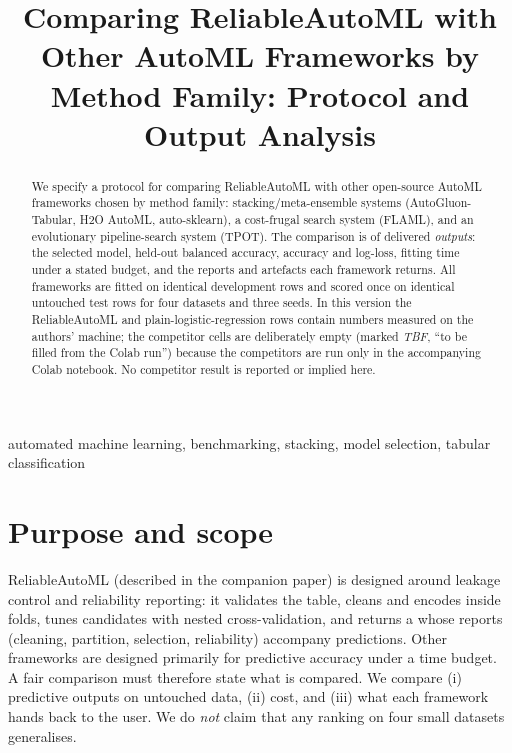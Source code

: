 \documentclass[conference]{IEEEtran}
\title{Comparing ReliableAutoML with Other AutoML Frameworks by Method Family: Protocol and Output Analysis}
\author{\jabulaniauthor\and\martinchanzauthor\and\oloratoauthor\and\mfundoauthor}
\newcommand{\tbf}{\textit{TBF}}
\begin{document}
\maketitle
\begin{abstract}
We specify a protocol for comparing ReliableAutoML with other open-source AutoML frameworks chosen by method family: stacking/meta-ensemble systems (AutoGluon-Tabular, H2O AutoML, auto-sklearn), a cost-frugal search system (FLAML), and an evolutionary pipeline-search system (TPOT). The comparison is of delivered \emph{outputs}: the selected model, held-out balanced accuracy, accuracy and log-loss, fitting time under a stated budget, and the reports and artefacts each framework returns. All frameworks are fitted on identical development rows and scored once on identical untouched test rows for four datasets and three seeds. In this version the ReliableAutoML and plain-logistic-regression rows contain numbers measured on the authors' machine; the competitor cells are deliberately empty (marked \tbf, ``to be filled from the Colab run'') because the competitors are run only in the accompanying Colab notebook. No competitor result is reported or implied here.
\end{abstract}
\begin{IEEEkeywords}
automated machine learning, benchmarking, stacking, model selection, tabular classification
\end{IEEEkeywords}

\section{Purpose and scope}
ReliableAutoML (described in the companion paper) is designed around leakage control and reliability reporting: it validates the table, cleans and encodes inside folds, tunes candidates with nested cross-validation, and returns a  whose reports (cleaning, partition, selection, reliability) accompany predictions. Other frameworks are designed primarily for predictive accuracy under a time budget. A fair comparison must therefore state what is compared. We compare (i) predictive outputs on untouched data, (ii) cost, and (iii) what each framework hands back to the user. We do \emph{not} claim that any ranking on four small datasets generalises.
\end{document}
